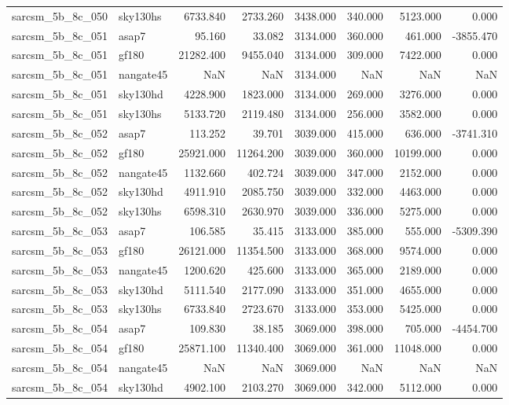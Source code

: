 \begin{tabular}{llrrrrrr}
sarcsm\_5b\_8c\_050 & sky130hs & 6733.840 & 2733.260 & 3438.000 & 340.000 & 5123.000 & 0.000 \\
sarcsm\_5b\_8c\_051 & asap7 & 95.160 & 33.082 & 3134.000 & 360.000 & 461.000 & -3855.470 \\
sarcsm\_5b\_8c\_051 & gf180 & 21282.400 & 9455.040 & 3134.000 & 309.000 & 7422.000 & 0.000 \\
sarcsm\_5b\_8c\_051 & nangate45 & NaN & NaN & 3134.000 & NaN & NaN & NaN \\
sarcsm\_5b\_8c\_051 & sky130hd & 4228.900 & 1823.000 & 3134.000 & 269.000 & 3276.000 & 0.000 \\
sarcsm\_5b\_8c\_051 & sky130hs & 5133.720 & 2119.480 & 3134.000 & 256.000 & 3582.000 & 0.000 \\
sarcsm\_5b\_8c\_052 & asap7 & 113.252 & 39.701 & 3039.000 & 415.000 & 636.000 & -3741.310 \\
sarcsm\_5b\_8c\_052 & gf180 & 25921.000 & 11264.200 & 3039.000 & 360.000 & 10199.000 & 0.000 \\
sarcsm\_5b\_8c\_052 & nangate45 & 1132.660 & 402.724 & 3039.000 & 347.000 & 2152.000 & 0.000 \\
sarcsm\_5b\_8c\_052 & sky130hd & 4911.910 & 2085.750 & 3039.000 & 332.000 & 4463.000 & 0.000 \\
sarcsm\_5b\_8c\_052 & sky130hs & 6598.310 & 2630.970 & 3039.000 & 336.000 & 5275.000 & 0.000 \\
sarcsm\_5b\_8c\_053 & asap7 & 106.585 & 35.415 & 3133.000 & 385.000 & 555.000 & -5309.390 \\
sarcsm\_5b\_8c\_053 & gf180 & 26121.000 & 11354.500 & 3133.000 & 368.000 & 9574.000 & 0.000 \\
sarcsm\_5b\_8c\_053 & nangate45 & 1200.620 & 425.600 & 3133.000 & 365.000 & 2189.000 & 0.000 \\
sarcsm\_5b\_8c\_053 & sky130hd & 5111.540 & 2177.090 & 3133.000 & 351.000 & 4655.000 & 0.000 \\
sarcsm\_5b\_8c\_053 & sky130hs & 6733.840 & 2723.670 & 3133.000 & 353.000 & 5425.000 & 0.000 \\
sarcsm\_5b\_8c\_054 & asap7 & 109.830 & 38.185 & 3069.000 & 398.000 & 705.000 & -4454.700 \\
sarcsm\_5b\_8c\_054 & gf180 & 25871.100 & 11340.400 & 3069.000 & 361.000 & 11048.000 & 0.000 \\
sarcsm\_5b\_8c\_054 & nangate45 & NaN & NaN & 3069.000 & NaN & NaN & NaN \\
sarcsm\_5b\_8c\_054 & sky130hd & 4902.100 & 2103.270 & 3069.000 & 342.000 & 5112.000 & 0.000 \\

\end{tabular}
